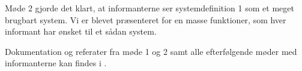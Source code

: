 Møde 2 gjorde det klart, at informanterne ser systemdefinition 1 som et meget brugbart system. Vi er blevet præsenteret for en masse funktioner, som hver informant har ønsket til et sådan system.

Dokumentation og referater fra møde 1 og 2 samt alle efterfølgende møder med informanterne kan findes i .

